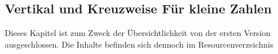 \subsection{ Vertikal und Kreuzweise Für kleine Zahlen }
\label{cha:math-practise-page2}
Dieses Kapitel ist zum Zweck der Übersichtlichkeit von der ersten Version ausgeschlossen. Die Inhalte befinden sich dennoch im Resourcenverzeichnis
%
%
%
